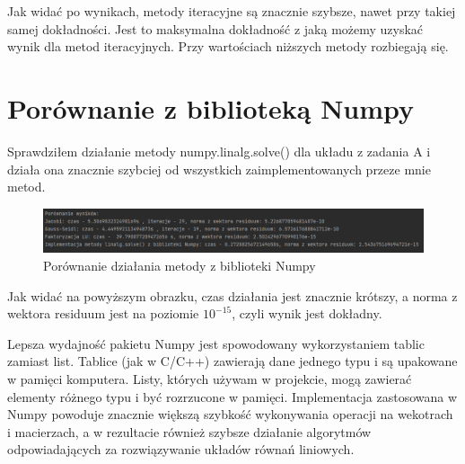 \documentclass[fleqn]{article}
\begin{document}
    \noindent Jak widać po wynikach, metody iteracyjne są znacznie szybsze,
    nawet przy takiej samej dokładności. Jest to maksymalna dokładność z jaką możemy uzyskać
    wynik dla metod iteracyjnych. Przy wartościach niższych metody rozbiegają się.
    \newpage
    \section{Porównanie z biblioteką Numpy}
    Sprawdziłem działanie metody numpy.linalg.solve() dla układu z zadania A i działa ona znacznie szybciej od 
    wszystkich zaimplementowanych przeze mnie metod.

    \begin{figure}[h]

        \centering
        \includegraphics[width=\textwidth]{porownanieNP.png}
        \centering
        \caption{Porównanie działania metody z biblioteki Numpy}

    \end{figure}

    \noindent Jak widać na powyższym obrazku, czas działania jest znacznie krótszy, a norma z wektora residuum
    jest na poziomie $10^{-15}$, czyli wynik jest dokładny. 

    \noindent Lepsza wydajność pakietu Numpy jest spowodowany wykorzystaniem tablic zamiast list. Tablice (jak w C/C++)
    zawierają dane jednego typu i są upakowane w pamięci komputera. Listy, których używam w projekcie, 
    mogą zawierać elementy różnego typu i być rozrzucone w pamięci. Implementacja zastosowana w Numpy
    powoduje znacznie większą szybkość wykonywania operacji na wekotrach i macierzach, a w rezultacie również szybsze
    działanie algorytmów odpowiadających za rozwiązywanie układów równań liniowych.
\end{document}
